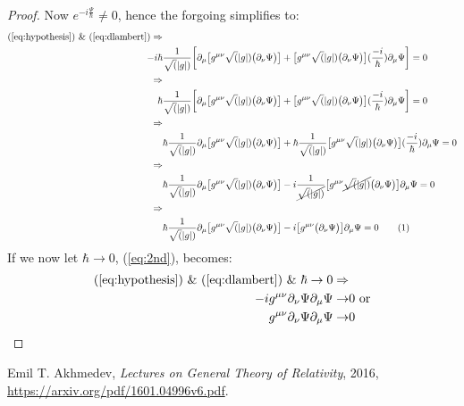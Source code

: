 \documentclass[]{article}
\newcommand\numberthis{\addtocounter{equation}{1}\tag{\theequation}}
\begin{document}
\begin{proof}
Now $e^{-i\frac{\Psi}{\hbar}}\neq0$, hence the forgoing simplifies to:
\begin{align*}
		\text{(\ref{eq:hypothesis}) \& (\ref{eq:dlambert})} \Rightarrow&\\
			-i \hbar& \frac{1}{\sqrt(|g|)} \bigg[\partial_{\mu}\big[g^{\mu\nu}\sqrt(|g|)\big(\partial_{\nu}\Psi\big)\big]  + \big[g^{\mu\nu}\sqrt(|g|)\big(\partial_{\nu}\Psi\big)\big](\frac{-i}{\hbar}) \partial_{\mu}\Psi\bigg]=0\\
			 \Rightarrow&\\
			\hbar& \frac{1}{\sqrt(|g|)} \bigg[\partial_{\mu}\big[g^{\mu\nu}\sqrt(|g|)\big(\partial_{\nu}\Psi\big)\big]  + \big[g^{\mu\nu}\sqrt(|g|)\big(\partial_{\nu}\Psi\big)\big](\frac{-i}{\hbar}) \partial_{\mu}\Psi\bigg]=0 \\
			\Rightarrow&\\
			 &\hbar \frac{1}{\sqrt(|g|)}\partial_{\mu}\big[g^{\mu\nu}\sqrt(|g|)\big(\partial_{\nu}\Psi\big)\big]  + \hbar \frac{1}{\sqrt(|g|)}\big[g^{\mu\nu}\sqrt(|g|)\big(\partial_{\nu}\Psi\big)\big](\frac{-i}{\hbar}) \partial_{\mu}\Psi=0 \\
			 \Rightarrow&\\
			 &\hbar \frac{1}{\sqrt(|g|)}\partial_{\mu}\big[g^{\mu\nu}\sqrt(|g|)\big(\partial_{\nu}\Psi\big)\big]  -i  \frac{1}{\cancel{\sqrt(|g|)}}\big[g^{\mu\nu}\cancel{\sqrt(|g|)}\big(\partial_{\nu}\Psi\big)\big] \partial_{\mu}\Psi=0\\
			 \Rightarrow&\\
			 &\hbar \frac{1}{\sqrt(|g|)}\partial_{\mu}\big[g^{\mu\nu}\sqrt(|g|)\big(\partial_{\nu}\Psi\big)\big]  -i  \big[g^{\mu\nu}\big(\partial_{\nu}\Psi\big)\big] \partial_{\mu}\Psi=0 \numberthis\label{eq:2nd}
\end{align*}
If we now let $\hbar \rightarrow 0$, (\ref{eq:2nd}), becomes:
\begin{align*}
	\text{(\ref{eq:hypothesis}) \& (\ref{eq:dlambert}) \& } \hbar \rightarrow 0 \Rightarrow&\\
	-i  g^{\mu\nu}\partial_{\nu}\Psi \partial_{\mu}\Psi\rightarrow&0 \text{ or}\\
	g^{\mu\nu}\partial_{\nu}\Psi \partial_{\mu}\Psi\rightarrow&0 
\end{align*}
\end{proof}

\begin{thebibliography}{9}
	
	Emil T. Akhmedev,
	\emph{Lectures on General Theory of Relativity},
	2016,
	\url{https://arxiv.org/pdf/1601.04996v6.pdf}.
	

\end{thebibliography}
\end{document}
